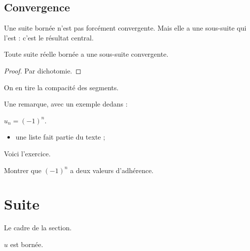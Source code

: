 \def\subsectionname{Convergence}
\subsection{\subsectionname}

Une suite bornée n'est pas forcément convergente.
Mais elle a une sous-suite qui l'est : c'est le résultat central.

\begin{theorem}[title={Bolzano-Weierstrass}, label=thm:bw]
  Toute suite réelle bornée a une sous-suite convergente.
\end{theorem}%
%
\begin{proof}
  Par dichotomie.
\end{proof}

On en tire la compacité des segments.

\begin{remark}
  Une remarque, avec un exemple dedans :
  \begin{example}
    $u_n = (-1)^n$.
  \end{example}
\end{remark}
\begin{itemize}
  \item une liste fait partie du texte ;
\end{itemize}
Voici l'exercice.

\begin{exercise}
  Montrer que $(-1)^n$ a deux valeurs d'adhérence.
\end{exercise}

\section{Suite}
Le cadre de la section.

\begin{assumption}[label=hyp:h]
  $u$ est bornée.
\end{assumption}

